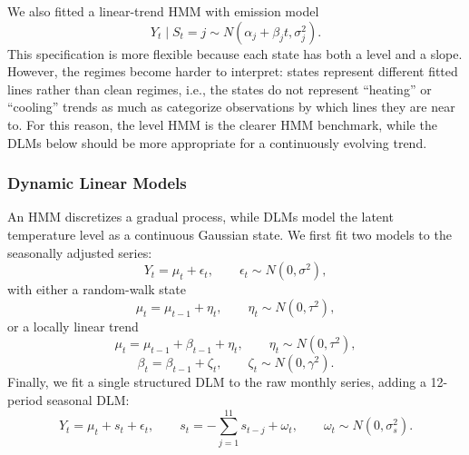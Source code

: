 \documentclass[10pt]{article}
\begin{document}
We also fitted a linear-trend HMM with emission model
\[
Y_t \mid S_t = j \sim N(\alpha_j + \beta_j t, \sigma_j^2).
\]
This specification is more flexible because each state has both a level and a slope.
However, the regimes become harder to interpret: states represent different fitted lines rather than clean regimes, i.e., the states do not represent ``heating'' or ``cooling'' trends as much as categorize observations by which lines they are near to.
For this reason, the level HMM is the clearer HMM benchmark, while the DLMs below should be more appropriate for a continuously evolving trend.

\subsubsection*{Dynamic Linear Models}

An HMM discretizes a gradual process, while DLMs model the latent temperature level as a continuous Gaussian state.
We first fit two models to the seasonally adjusted series:
\[
Y_t = \mu_t + \epsilon_t, \qquad \epsilon_t \sim N(0, \sigma^2),
\]
with either a random-walk state
\[
\mu_t = \mu_{t-1} + \eta_t, \qquad \eta_t \sim N(0, \tau^2),
\]
or a locally linear trend
\[
\mu_t = \mu_{t-1} + \beta_{t-1} + \eta_t, \qquad \eta_t \sim N(0, \tau^2),
\]
\[
\beta_t = \beta_{t-1} + \zeta_t, \qquad \zeta_t \sim N(0, \gamma^2).
\]
Finally, we fit a single structured DLM to the raw monthly series, adding a 12-period seasonal DLM:
\[
Y_t = \mu_t + s_t + \epsilon_t, \qquad s_t = - \sum_{j=1}^{11} s_{t-j} + \omega_t, \qquad \omega_t \sim N(0, \sigma_s^2).
\]
\end{document}
